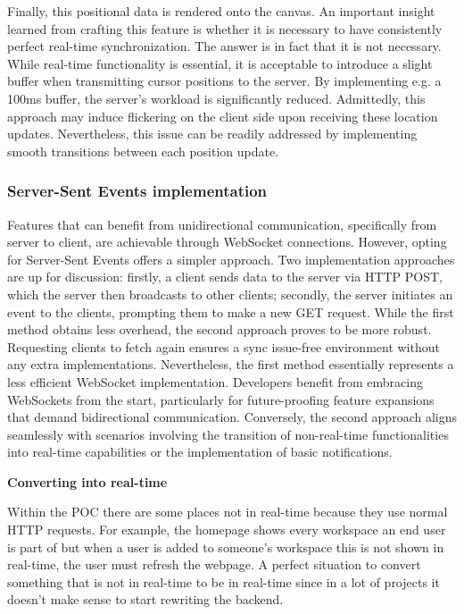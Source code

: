 Finally, this positional data is rendered onto the canvas. An important insight learned from crafting this feature is whether it is necessary to have consistently perfect real-time synchronization. The answer is in fact that it is not necessary. While real-time functionality is essential, it is acceptable to introduce a slight buffer when transmitting cursor positions to the server. By implementing e.g. a 100ms buffer, the server's workload is significantly reduced. Admittedly, this approach may induce flickering on the client side upon receiving these location updates. Nevertheless, this issue can be readily addressed by implementing smooth transitions between each position update.

\subsubsection{Server-Sent Events implementation}

Features that can benefit from unidirectional communication, specifically from server to client, are achievable through WebSocket connections. However, opting for Server-Sent Events offers a simpler approach. Two implementation approaches are up for discussion: firstly, a client sends data to the server via HTTP POST, which the server then broadcasts to other clients; secondly, the server initiates an event to the clients, prompting them to make a new GET request. While the first method obtains less overhead, the second approach proves to be more robust. Requesting clients to fetch again ensures a sync issue-free environment without any extra implementations. Nevertheless, the first method essentially represents a less efficient WebSocket implementation. Developers benefit from embracing WebSockets from the start, particularly for future-proofing feature expansions that demand bidirectional communication. Conversely, the second approach aligns seamlessly with scenarios involving the transition of non-real-time functionalities into real-time capabilities or the implementation of basic notifications.

\textbf{Converting into real-time}

Within the POC there are some places not in real-time because they use normal HTTP requests. For example, the homepage shows every workspace an end user is part of but when a user is added to someone's workspace this is not shown in real-time, the user must refresh the webpage. A perfect situation to convert something that is not in real-time to be in real-time since in a lot of projects it doesn't make sense to start rewriting the backend.

